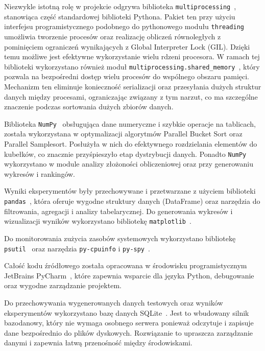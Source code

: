 Niezwykle istotną rolę w projekcie odgrywa biblioteka \texttt{multiprocessing}~\cite{bib:Multiprocessing}, stanowiąca część standardowej 
biblioteki Pythona. Pakiet ten przy użyciu interfejsu programistycznego podobnego do pythonowego modułu \texttt{threading} umożliwia 
tworzenie procesów oraz realizację obliczeń równoległych z pominięciem ograniczeń wynikających z Global Interpreter Lock (GIL). 
Dzięki temu możliwe jest efektywne wykorzystanie wielu rdzeni procesora. W ramach tej biblioteki wykorzystano również 
moduł \texttt{multiprocessing.shared\_memory}~\cite{bib:SharedMemory}, który pozwala na bezpośredni dostęp wielu procesów do 
wspólnego obszaru pamięci. Mechanizm ten eliminuje konieczność serializacji oraz przesyłania dużych struktur danych między procesami, 
ograniczając związany z tym narzut, co ma szczególne znaczenie podczas sortowania dużych zbiorów danych.

Biblioteka \texttt{NumPy}~\cite{bib:NumPy} obsługująca dane numeryczne i szybkie operacje na tablicach, została wykorzystana w 
optymalizacji algorytmów Parallel Bucket Sort oraz Parallel Samplesort. Posłużyła w nich do efektywnego rozdzielania elementów do kubełków, 
co znacznie przyśpieszyło etap dystrybucji danych. Ponadto \texttt{NumPy} wykorzystano w module analizy złożoności obliczeniowej oraz 
przy generowaniu wykresów i rankingów. 

Wyniki eksperymentów były przechowywane i przetwarzane z użyciem biblioteki \texttt{pandas}~\cite{bib:Pandas}, która oferuje wygodne 
struktury danych (DataFrame) oraz narzędzia do filtrowania, agregacji i analizy tabelarycznej. Do generowania wykresów i wizualizacji 
wyników wykorzystano bibliotekę \texttt{matplotlib}~\cite{bib:Matplotlib}.

Do monitorowania zużycia zasobów systemowych wykorzystano bibliotekę \texttt{psutil}~\cite{bib:Psutil} oraz 
narzędzia \texttt{py-cpuinfo} i \texttt{py-spy}~\cite{bib:PySpy}. 

Całość kodu źródłowego została opracowana w środowisku programistycznym JetBrains PyCharm~\cite{bib:PyCharm}, 
które zapewnia wsparcie dla języka Python, debugowanie oraz wygodne zarządzanie projektem.

Do przechowywania wygenerowanych danych testowych oraz wyników eksperymentów wykorzystano bazę danych SQLite~\cite{bib:SQLite}. 
Jest to wbudowany silnik bazodanowy, który nie wymaga osobnego serwera ponieważ odczytuje i zapisuje dane bezpośrednio do plików dyskowych. 
Rozwiązanie to upraszcza zarządzanie danymi i zapewnia łatwą przenośność między środowiskami.

